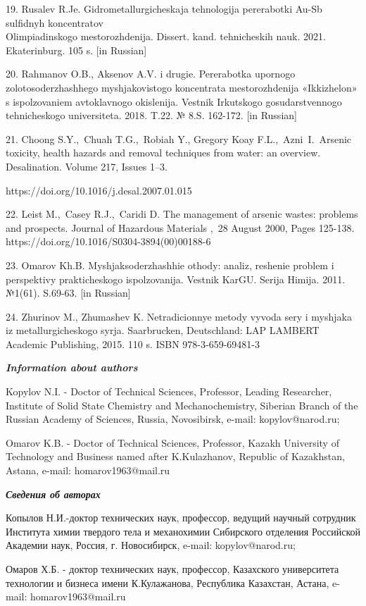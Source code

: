 \begin{noparindent}
19. Rusalev R.Je. Gidrometallurgicheskaja tehnologija pererabotki Au-Sb
sul\textquotesingle fidnyh koncentratov \\Olimpiadinskogo mestorozhdenija.
Dissert. kand. tehnicheskih nauk. 2021. Ekaterinburg. 105 s. {[}in
Russian{]}

20. Rahmanov O.B., Aksenov A.V. i drugie. Pererabotka upornogo
zolotosoderzhashhego mysh\textquotesingle jakovistogo koncentrata
mestorozhdenija «Ikkizhelon» s ispol\textquotesingle zovaniem
avtoklavnogo okislenija. Vestnik Irkutskogo gosudarstvennogo
tehnicheskogo universiteta. 2018. T.22. № 8.S. 162-172. {[}in Russian{]}

21. Choong S.Y.,~Chuah T.G.,~Robiah Y., Gregory Koay
F.L.,~Azni~I.~Arsenic toxicity, health hazards and removal techniques
from water: an overview. Desalination. Volume 217, Issues 1--3.

https://doi.org/10.1016/j.desal.2007.01.015

22. Leist M.,~Casey R.J.,~Caridi D. The management of arsenic wastes:
problems and prospects. Journal of Hazardous Materials ,~28 August 2000,
Pages 125-138. https://doi.org/10.1016/S0304-3894(00)00188-6

23. Omarov Kh.B. Mysh\textquotesingle jaksoderzhashhie othody: analiz,
reshenie problem i perspektivy prakticheskogo
ispol\textquotesingle zovanija. Vestnik KarGU. Serija Himija. 2011.
№1(61). S.69-63. {[}in Russian{]}

24. Zhurinov M., Zhumashev K. Netradicionnye metody vyvoda sery i
mysh\textquotesingle jaka iz metallurgicheskogo syr\textquotesingle ja.
Saarbrucken, Deutschland: LAP LAMBERT Academic Publishing, 2015. 110 s.
ISBN 978-3-659-69481-3
\end{noparindent}

\emph{{\bfseries Information about authors}}

\begin{noparindent}
Kopylov N.I. - Doctor of Technical Sciences, Professor, Leading
Researcher, Institute of Solid State Chemistry and Mechanochemistry,
Siberian Branch of the Russian Academy of Sciences, Russia, Novosibirsk,
e-mail: kopylov@narod.ru;

Omarov K.B. - Doctor of Technical Sciences, Professor, Kazakh University
of Technology and Business named after K.Kulazhanov, Republic of
Kazakhstan, Astana, e-mail: homarov1963@mail.ru
\end{noparindent}

\emph{{\bfseries Сведения об авторах}}

\begin{noparindent}
Копылов Н.И.-доктор технических наук, профессор, ведущий научный
сотрудник Института химии твердого тела и механохимии Сибирского
отделения Российской Академии наук, Россия, г. Новосибирск, e-mail:
kopylov@narod.ru;

Омаров Х.Б. - доктор технических наук, профессор, Казахского
университета технологии и бизнеса имени К.Кулажанова, Республика
Казахстан, Астана, e-mail: homarov1963@mail.ru
\end{noparindent}
